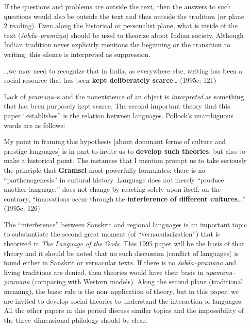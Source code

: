 If the questions and problems are outside the text, then the answers to such questions would also be outside the text and thus outside the tradition (or plane 2 reading). Even along the historical or personalist plane, what is inside of the text (\textit{śabda–pramāṇa}) should be used to theorize about Indian society. Although Indian tradition never explicitly mentions the beginning or the transition to writing, this silence is interpreted as suppression.

\begin{myquote}
…we may need to recognize that in India, as everywhere else, writing has been a social resource that has been \textbf{kept deliberately scarce}… (1995c: 121)
\end{myquote}

Lack of \textit{pramāṇa}–s and the nonexistence of an object is \textit{interpreted} as something that has been purposely kept scarce. The second important theory that this paper “establishes” is the relation between languages. Pollock’s unambiguous words are as follows:

\begin{myquote}
My point in framing this hypothesis [about dominant forms of culture and prestige languages] is in part to invite us to \textbf{develop such theories}, but also to make a historical point. The instances that I mention prompt us to take seriously the principle that\textbf{ Gramsci }most powerfully formulates: there is no “parthenogenesis” in cultural history. Language does not merely “produce another language,” does not change by reacting solely upon itself; on the contrary, “innovations occur through the \textbf{interference of different cultures}…” (1995c: 126)
\end{myquote}

The “interference” between Sanskrit and regional languages is an important topic to substantiate the second great moment (of “vernacularization”) that is theorized in \textit{The Language of the Gods}. This 1995 paper will be the basis of that theory and it should be noted that no such discussion (conflict of languages) is found either in Sanskrit or vernacular texts. If there is no \textit{śabda–pramāṇa} and living traditions are denied, then theories would have their basis in \textit{upamāna–pramāṇa} (comparing with Western models). Along the second plane (traditional meaning), the basic rule is the non–application of theory, but in this paper, we are invited to develop social theories to understand the interaction of languages. All the other papers in this period discuss similar topics and the impossibility of the three–dimensional philology should be clear.

